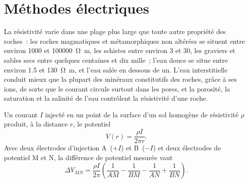 \begin{omfigure}
\par{}\label{fig:b3:field-lab-methods-3:magnetic}
\end{omfigure}

\section{Méthodes électriques}\label{sec:b3:field-lab-methods-3:electrical}

La résistivité varie dans une plage plus large que toute autre propriété des
roches~: les roches magmatiques et métamorphiques non altérées se situent entre
environ \num{1000} et \qty{100000}{\ohm\metre}, les schistes entre environ
\num{3} et \num{30}, les graviers et sables secs entre quelques centaines et dix
mille~; l'eau douce se situe entre environ \num{1.5} et
\qty{130}{\ohm\metre}, et l'eau salée en dessous de un. L'eau interstitielle
conduit mieux que la plupart des minéraux constitutifs des roches, grâce à ses
ions, de sorte que le courant circule surtout dans les pores, et la porosité, la
saturation et la salinité de l'eau contrôlent la résistivité d'une roche.

\begin{theorem}\label{thm:b3:field-lab-methods-3:point-source}
Un courant $I$ injecté en un point de la surface d'un sol homogène de
résistivité $\rho$ produit, à la distance $r$, le potentiel
\[
V(r) = \frac{\rho I}{2\pi r} .
\]
Avec deux électrodes d'injection A~($+I$) et B~($-I$) et deux électrodes de
potentiel M et N, la différence de potentiel mesurée vaut
\[
\Delta V_{MN} = \frac{\rho I}{2\pi}\left(\frac{1}{AM} - \frac{1}{BM}
               - \frac{1}{AN} + \frac{1}{BN}\right) .
\]
\end{theorem}

